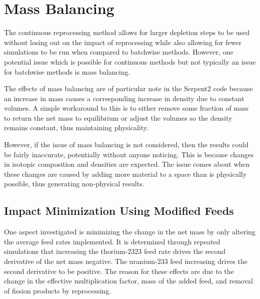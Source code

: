 


\section{Mass Balancing}

The continuous reprocessing method allows for larger depletion steps to be used without losing out on the impact of reprocessing while also allowing for fewer simulations to be run when compared to batchwise methods. However, one potential issue which is possible for continuous methods but not typically an issue for batchwise methods is mass balancing.

The effects of mass balancing are of particular note in the Serpent2 code because an increase in mass causes a corresponding increase in density due to constant volumes. A simple workaround to this is to either remove some fraction of mass to return the net mass to equilibrium or adjust the volumes so the density remains constant, thus maintaining physicality.

However, if the issue of mass balancing is not considered, then the results could be fairly inaccurate, potentially without anyone noticing. This is because changes in isotopic composition and densities are expected. The issue comes about when these changes are caused by adding more material to a space than is physically possible, thus generating non-physical results.

\subsection{Impact Minimization Using Modified Feeds}

One aspect investigated is minimizing the change in the net mass by only altering the average feed rates implemented. It is determined through repeated simulations that increasing the thorium-2323 feed rate drives the second derivative of the net mass negative. The uranium-233 feed increasing drives the second derivative to be positive. The reason for these effects are due to the change in the effective multiplication factor, mass of the added feed, and removal of fission products by reprocessing.

